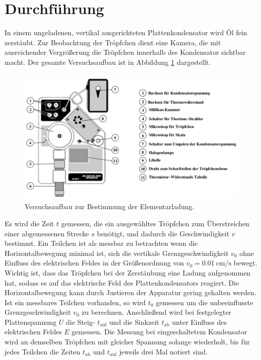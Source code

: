 \section{Durchf\"uhrung}
\label{sec:Durchfuehrung}
In einem ungeladenen, vertikal ausgerichteten Plattenkondensator wird Öl fein zerstäubt.
Zur Beobachtung der Tröpfchen dient eine Kamera, die mit ausreichender Vergrößerung die Tröpfchen innerhalb des Kondensator sichtbar macht. Der gesamte Versuchsaufbau ist in Abbildung \ref{fig:aufbau} dargestellt.
\begin{figure}
	\centering
	\includegraphics[width=\textwidth]{Bilder/aufbau.pdf}
	\caption{Versuchsaufbau zur Bestimmung der Elementarladung.\cite{skript}}
	\label{fig:aufbau}
\end{figure}
Es wird die Zeit $t$ gemessen, die ein ausgewähltes Tröpfchen zum Überstreichen einer abgemessenen Strecke $s$ benötigt, und  dadurch die Geschwindigkeit $v$ bestimmt.
Ein Teilchen ist als messbar zu betrachten wenn die Horizontalbewegung minimal ist, 
sich die vertikale Grenzgeschwindigkeit $v_0$ ohne Einfluss des elektrischen Feldes in der Größenordnung von $v_0=\SI{0.01}{\centi\meter\per\second}$ bewegt. 
Wichtig ist, dass das Tröpfchen bei der Zerstäubung eine Ladung aufgenommen hat, sodass es auf das elektrische Feld des Plattenkondensators reagiert. Die Horizontalbewegung kann durch Justieren der Apparatur gering gehalten werden.\\
Ist ein messbares Teilchen vorhanden, so wird $t_0$ gemessen um die unbeeinflusste Grenzgeschwindigkeit $v_0$ zu berechnen. 
Anschließend wird bei festgelegter Plattenspannung $U$ die Steig- $t_\text{auf}$ und die Sinkzeit $t_\text{ab}$ unter Einfluss des elektrischen Feldes $E$ gemessen.
Die Messung bei eingeschaltetem Kondensator wird an demselben Tröpfchen mit gleicher Spannung solange wiederholt, bis für jedes Teilchen die Zeiten $t_\text{ab}$ und $t_\text{auf}$ jeweils drei Mal notiert sind.
